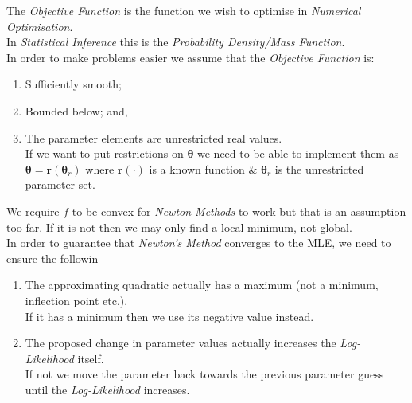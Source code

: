 \documentclass[11pt,a4paper]{article}
\begin{document}
The \textit{Objective Function} is the function we wish to optimise in \textit{Numerical Optimisation}.\\
\nb In \textit{Statistical Inference} this is the \textit{Probability Density/Mass Function}.\\

In order to make problems easier we assume that the \textit{Objective Function} is:
\begin{enumerate}
	\item Sufficiently smooth;
	\item Bounded below; and,
	\item The parameter elements are unrestricted real values.\\
	If we want to put restrictions on $\pmb\theta$ we need to be able to implement them as $\pmb\theta=\textbf{r}(\pmb\theta_r)$ where $\textbf{r}(\cdot)$ is a known function \& $\pmb\theta_r$ is the unrestricted parameter set.
\end{enumerate}
\nb We require $f$ to be convex for \textit{Newton Methods} to work but that is an assumption too far. If it is not then we may only find a local minimum, not global.\\

In order to guarantee that \textit{Newton's Method} converges to the MLE, we need to ensure the followin
\begin{enumerate}
	\item The approximating quadratic actually has a maximum (not a minimum, inflection point etc.).\\
	If it has a minimum then we use its negative value instead.
	\item The proposed change in parameter values actually increases the \textit{Log-Likelihood} itself.\\
	If not we move the parameter back towards the previous parameter guess until the \textit{Log-Likelihood} increases.
\end{enumerate}
\end{document}
